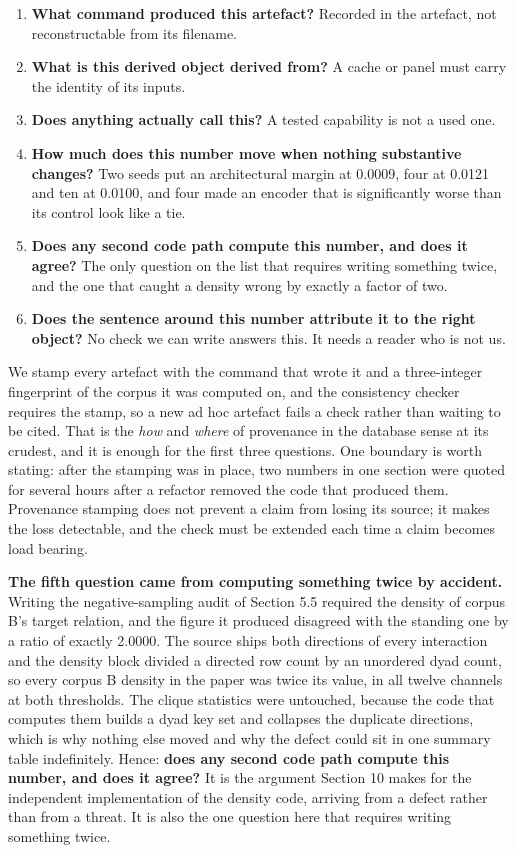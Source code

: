\documentclass[twoside,11pt]{article}
\providecommand{\tightlist}{%
  \setlength{\itemsep}{0pt}\setlength{\parskip}{0pt}}
\begin{document}
\begin{enumerate}
\def\labelenumi{\arabic{enumi}.}
\tightlist
\item
  \textbf{What command produced this artefact?} Recorded in the artefact, not reconstructable from its filename.
\item
  \textbf{What is this derived object derived from?} A cache or panel must carry the identity of its inputs.
\item
  \textbf{Does anything actually call this?} A tested capability is not a used one.
\item
  \textbf{How much does this number move when nothing substantive changes?} Two seeds put an architectural margin at 0.0009, four at 0.0121 and ten at 0.0100, and four made an encoder that is significantly worse than its control look like a tie.
\item
  \textbf{Does any second code path compute this number, and does it agree?} The only question on the list that requires writing something twice, and the one that caught a density wrong by exactly a factor of two.
\item
  \textbf{Does the sentence around this number attribute it to the right object?} No check we can write answers this. It needs a reader who is not us.
\end{enumerate}

We stamp every artefact with the command that wrote it and a three-integer fingerprint of the corpus it was computed on, and the consistency checker requires the stamp, so a new ad hoc artefact fails a check rather than waiting to be cited. That is the \emph{how} and \emph{where} of provenance in the database sense \citep{datasheets,modelcards} at its crudest, and it is enough for the first three questions. One boundary is worth stating: after the stamping was in place, two numbers in one section were quoted for several hours after a refactor removed the code that produced them. Provenance stamping does not prevent a claim from losing its source; it makes the loss detectable, and the check must be extended each time a claim becomes load bearing.

\textbf{The fifth question came from computing something twice by accident.} Writing the negative-sampling audit of Section 5.5 required the density of corpus B's target relation, and the figure it produced disagreed with the standing one by a ratio of exactly 2.0000. The source ships both directions of every interaction and the density block divided a directed row count by an unordered dyad count, so every corpus B density in the paper was twice its value, in all twelve channels at both thresholds. The clique statistics were untouched, because the code that computes them builds a dyad key set and collapses the duplicate directions, which is why nothing else moved and why the defect could sit in one summary table indefinitely. Hence: \textbf{does any second code path compute this number, and does it agree?} It is the argument Section 10 makes for the independent implementation of the density code, arriving from a defect rather than from a threat. It is also the one question here that requires writing something twice.
\end{document}
